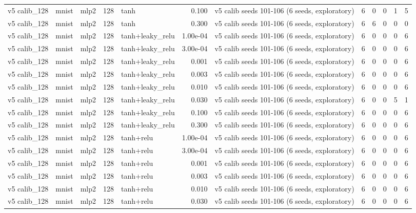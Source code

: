 \begin{table}[htbp]
{\begin{tabular}{@{}lllrlrlrrrrr@{}}
v5 calib\_128 & mnist & mlp2 & 128 & tanh & 0.100 & v5 calib seeds 101-106 (6 seeds, exploratory) & 6 & 0 & 0 & 1 & 5 \\
v5 calib\_128 & mnist & mlp2 & 128 & tanh & 0.300 & v5 calib seeds 101-106 (6 seeds, exploratory) & 6 & 6 & 0 & 0 & 0 \\
v5 calib\_128 & mnist & mlp2 & 128 & tanh+leaky\_relu & 1.00e-04 & v5 calib seeds 101-106 (6 seeds, exploratory) & 6 & 0 & 0 & 0 & 6 \\
v5 calib\_128 & mnist & mlp2 & 128 & tanh+leaky\_relu & 3.00e-04 & v5 calib seeds 101-106 (6 seeds, exploratory) & 6 & 0 & 0 & 0 & 6 \\
v5 calib\_128 & mnist & mlp2 & 128 & tanh+leaky\_relu & 0.001 & v5 calib seeds 101-106 (6 seeds, exploratory) & 6 & 0 & 0 & 0 & 6 \\
v5 calib\_128 & mnist & mlp2 & 128 & tanh+leaky\_relu & 0.003 & v5 calib seeds 101-106 (6 seeds, exploratory) & 6 & 0 & 0 & 0 & 6 \\
v5 calib\_128 & mnist & mlp2 & 128 & tanh+leaky\_relu & 0.010 & v5 calib seeds 101-106 (6 seeds, exploratory) & 6 & 0 & 0 & 0 & 6 \\
v5 calib\_128 & mnist & mlp2 & 128 & tanh+leaky\_relu & 0.030 & v5 calib seeds 101-106 (6 seeds, exploratory) & 6 & 0 & 0 & 5 & 1 \\
v5 calib\_128 & mnist & mlp2 & 128 & tanh+leaky\_relu & 0.100 & v5 calib seeds 101-106 (6 seeds, exploratory) & 6 & 0 & 0 & 0 & 6 \\
v5 calib\_128 & mnist & mlp2 & 128 & tanh+leaky\_relu & 0.300 & v5 calib seeds 101-106 (6 seeds, exploratory) & 6 & 0 & 0 & 0 & 6 \\
v5 calib\_128 & mnist & mlp2 & 128 & tanh+relu & 1.00e-04 & v5 calib seeds 101-106 (6 seeds, exploratory) & 6 & 0 & 0 & 0 & 6 \\
v5 calib\_128 & mnist & mlp2 & 128 & tanh+relu & 3.00e-04 & v5 calib seeds 101-106 (6 seeds, exploratory) & 6 & 0 & 0 & 0 & 6 \\
v5 calib\_128 & mnist & mlp2 & 128 & tanh+relu & 0.001 & v5 calib seeds 101-106 (6 seeds, exploratory) & 6 & 0 & 0 & 0 & 6 \\
v5 calib\_128 & mnist & mlp2 & 128 & tanh+relu & 0.003 & v5 calib seeds 101-106 (6 seeds, exploratory) & 6 & 0 & 0 & 0 & 6 \\
v5 calib\_128 & mnist & mlp2 & 128 & tanh+relu & 0.010 & v5 calib seeds 101-106 (6 seeds, exploratory) & 6 & 0 & 0 & 0 & 6 \\
v5 calib\_128 & mnist & mlp2 & 128 & tanh+relu & 0.030 & v5 calib seeds 101-106 (6 seeds, exploratory) & 6 & 0 & 0 & 0 & 6 \\

\end{tabular}}
\end{table}
